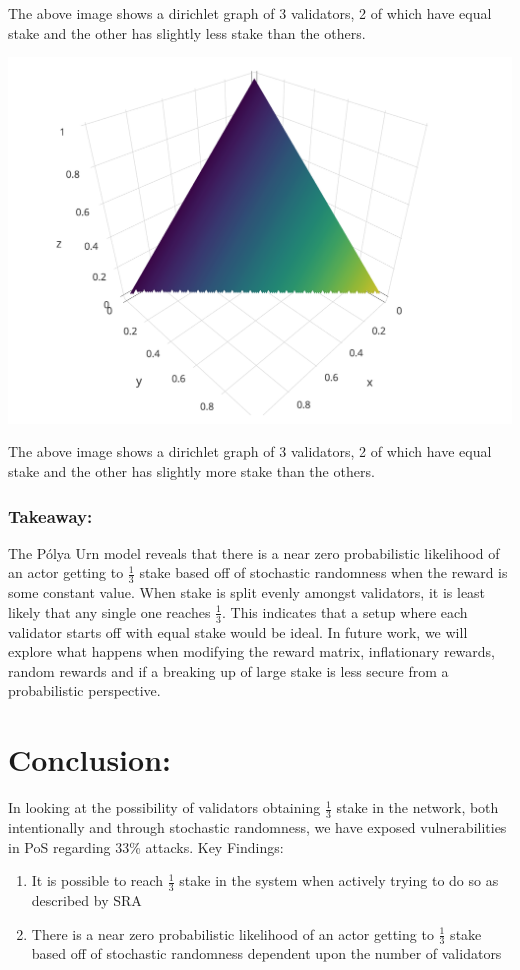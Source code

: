 \documentclass{article}
\renewcommand{\|}{\;|\;}
\begin{document}
The above image shows a dirichlet graph of 3 validators, 2 of which have equal stake and the other has slightly less stake than the others. 
\begin{center}
\includegraphics[scale=0.3]{images/dir_2_1_1.png}
\end{center}
The above image shows a dirichlet graph of 3 validators, 2 of which have equal stake and the other has slightly more stake than the others. 

\subsubsection*{Takeaway:}
 The P\'olya Urn model reveals that there is a near zero probabilistic likelihood of an actor getting to $\frac{1}{3}$ stake based off of stochastic randomness when the reward is some constant value. When stake is split evenly amongst validators, it is least likely that any single one reaches $\frac{1}{3}$. This indicates that a setup where each validator starts off with equal stake would be ideal. In future work, we will explore what happens when modifying the reward matrix, inflationary rewards, random rewards and if a breaking up of large stake is less secure from a probabilistic perspective. 

\section{Conclusion:}
In looking at the possibility of validators obtaining $\frac{1}{3}$ stake in the network, both intentionally and through stochastic randomness, we have exposed vulnerabilities in PoS regarding 33\% attacks. 
\newline
Key Findings: 
\begin{enumerate}
   \item It is possible to reach $\frac{1}{3}$ stake in the system when actively trying to do so as described by SRA
   \item There is a near zero probabilistic likelihood of an actor getting to $\frac{1}{3}$ stake based off of stochastic randomness dependent upon the number of validators 
\end{enumerate}\newline
\end{document}
